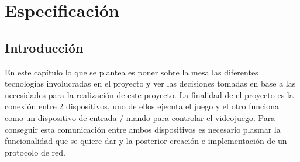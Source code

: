%
%
%
%
%
%
%
%
%
%


\begin{FraseCelebre}
\begin{Frase}
\end{Frase}
\begin{Fuente}
\end{Fuente}
\end{FraseCelebre}


\chapter{Especificaci\'on}
\label{cap3}
\label{cap:especificacion}

\section{Introducci\'on}
\label{cap3:sec:intro}
En este cap\'itulo lo que se plantea es poner sobre la mesa las diferentes tecnolog\'ias involucradas en el proyecto y ver las decisiones tomadas en base a las necesidades para la realizaci\'on de este proyecto. La finalidad de el proyecto es la conexi\'on entre 2 dispositivos, uno de ellos ejecuta el juego y el otro funciona como un dispositivo de entrada / mando para controlar el videojuego. 
Para conseguir esta comunicaci\'on entre ambos dispositivos es necesario plasmar la funcionalidad que se quiere dar y la posterior creaci\'on e implementaci\'on de un protocolo de red.


